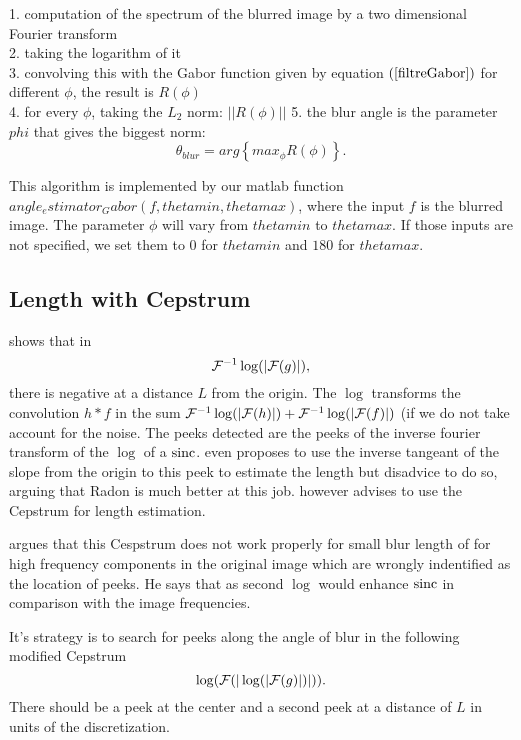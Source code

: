1. computation of the spectrum of the blurred image by a two dimensional Fourier transform\\
2. taking the logarithm of it\\
3. convolving this with the Gabor function given by equation $(\ref{filtreGabor})$ for different $\phi$, the result is $R(\phi)$\\
4. for every $\phi$, taking the $L_2$ norm: $||R(\phi)||$
5. the blur angle is the parameter $phi$ that gives the biggest norm:
\begin{equation}
\theta_{blur} = arg \left\lbrace max_{\phi}R(\phi)\right\rbrace.
\end{equation}

This algorithm is implemented by our matlab function $angle_estimator_Gabor(f,thetamin, thetamax)$, where the input $f$ is the blurred image. The parameter $\phi$ will vary from $thetamin$ to $thetamax$. If those inputs are not specified, we set them to $0$ for $thetamin$ and $180$ for $thetamax$.



\subsection{Length with Cepstrum}
\label{subsec:Cep}
\cite{biemond1990iterative} shows that in
\[ \mathcal{F}^{-1}\log(|\mathcal{F}(g)|), \]
there is negative at a distance $L$ from the origin.
The $\log$ transforms the convolution $h*f$ in the sum
$\mathcal{F}^{-1}\log(|\mathcal{F}(h)|) + \mathcal{F}^{-1}\log(|\mathcal{F}(f)|)$
(if we do not take account for the noise.
The peeks detected are the peeks of the inverse fourier
transform of the $\log$ of a $\operatorname{sinc}$.
\cite{krahmer2006blind} even proposes to use the inverse
tangeant of the slope from the origin to this peek to
estimate the length but disadvice to do so,
arguing that Radon is much better at this job.
\cite{krahmer2006blind} however advises to use the Cepstrum
for length estimation.

\cite{Deshpande2014606} argues that this Cespstrum does
not work properly for small blur length of for high
frequency components in the original image which
are wrongly indentified as the location of peeks.
He says that as second $\log$ would enhance $\operatorname{sinc}$ in comparison
with the image frequencies.

It's strategy is to search for peeks
along the angle of blur in
the following modified Cepstrum
\[ \log(\mathcal{F}(|\log(|\mathcal{F}(g)|)|)). \]
There should be a peek at the center and a second peek
at a distance of $L$ in units of the discretization.

